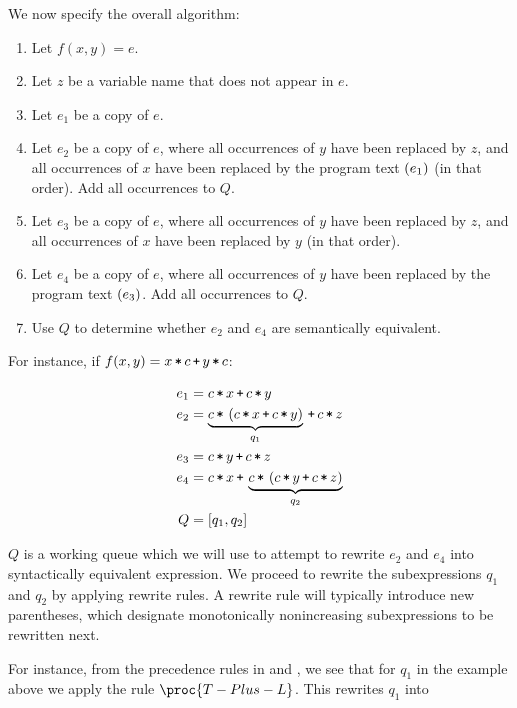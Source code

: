 We now specify the overall algorithm:

\begin{enumerate}

\item Let $f(x,y)=e$.

\item Let $z$ be a variable name that does not appear in $e$.

\item Let $e_1$ be a copy of $e$.

\item Let $e_2$ be a copy of $e$, where all occurrences of $y$ have been
replaced by $z$, and all occurrences of $x$ have been replaced by the program
text $\left({e_1}\right)$ (in that order). Add all occurrences to $Q$.

\item Let $e_3$ be a copy of $e$, where all occurrences of $y$ have been
replaced by $z$, and all occurrences of $x$ have been replaced by $y$ (in that
order).

\item Let $e_4$ be a copy of $e$, where all occurrences of $y$ have been
replaced by the program text $\left({e_3}\right)$. Add all occurrences to $Q$.

\item Use $Q$ to determine whether $e_2$ and $e_4$ are semantically equivalent.

\end{enumerate}

For instance, if $f(x,y)=x\lt c \lp y\lt c$:

\begin{align*}
e_1 &= c\lt x \lp c\lt y \\
e_2 &= \underbrace{c \lt \p{c\lt x \lp c\lt y}}_{q_1} \lp c \lt z \\
e_3 &= c\lt y \lp c \lt z \\
e_4 &= c \lt x \lp \underbrace{c \lt \p{ c \lt y \lp c \lt z }}_{q_2} \\
Q &= \seq{q_1, q_2 }
\end{align*}

$Q$ is a working queue which we will use to attempt to rewrite $e_2$ and $e_4$
into syntactically equivalent expression. We proceed to rewrite the
subexpressions $q_1$ and $q_2$ by applying rewrite rules. A rewrite rule will
typically introduce new parentheses, which designate monotonically
nonincreasing subexpressions to be rewritten next.

For instance, from the precedence rules in  and
, we see that for $q_1$ in the example above we apply
the rule $\proc{T-Plus-L}$. This rewrites $q_1$ into

